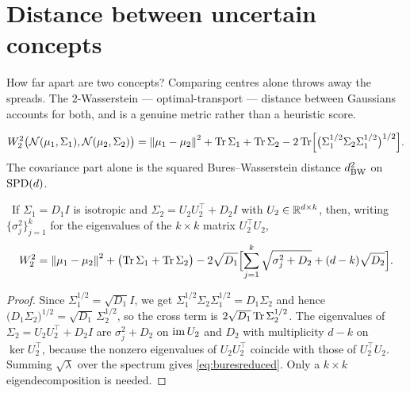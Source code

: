 \section{Distance between uncertain concepts}

\begin{intu}\Intu
How far apart are two concepts? Comparing centres alone throws away the
spreads. The $2$-Wasserstein --- optimal-transport --- distance between
Gaussians accounts for both, and is a genuine metric rather than a
heuristic score.
\end{intu}

\begin{definition}\label{def:bures}
\begin{equation}\label{eq:bures}
  W_2^2\bigl(\mathcal N(\mu_1,\Sigma_1),\mathcal N(\mu_2,\Sigma_2)\bigr)
  =\left\lVert \mu_1-\mu_2 \right\rVert^2+\operatorname{Tr}\Sigma_1+\operatorname{Tr}\Sigma_2
   -2\operatorname{Tr}\Bigl[\bigl(\Sigma_1^{1/2}\Sigma_2\Sigma_1^{1/2}\bigr)^{1/2}\Bigr].
\end{equation}
The covariance part alone is the squared Bures--Wasserstein distance
$d_{\mathrm{BW}}^2$ on $\mathrm{SPD}(d)$.
\end{definition}

\begin{proposition}\label{prop:buresiso}
\Proved\ If $\Sigma_1=D_1I$ is isotropic and
$\Sigma_2=U_2U_2^\top+D_2I$ with $U_2\in\mathbb{R}^{d\times k}$, then, writing
$\{\sigma_j^2\}_{j=1}^k$ for the eigenvalues of the $k\times k$ matrix
$U_2^\top U_2$,
\begin{equation}\label{eq:buresreduced}
  W_2^2=\left\lVert \mu_1-\mu_2 \right\rVert^2+\bigl(\operatorname{Tr}\Sigma_1+\operatorname{Tr}\Sigma_2\bigr)
  -2\sqrt{D_1}\Bigl[\sum_{j=1}^k\sqrt{\sigma_j^2+D_2}+(d-k)\sqrt{D_2}\Bigr].
\end{equation}
\end{proposition}
\begin{proof}
Since $\Sigma_1^{1/2}=\sqrt{D_1}I$, we get
$\Sigma_1^{1/2}\Sigma_2\Sigma_1^{1/2}=D_1\Sigma_2$ and hence
$\bigl(D_1\Sigma_2\bigr)^{1/2}=\sqrt{D_1}\,\Sigma_2^{1/2}$, so the cross
term is $2\sqrt{D_1}\operatorname{Tr}\Sigma_2^{1/2}$. The eigenvalues of
$\Sigma_2=U_2U_2^\top+D_2I$ are $\sigma_j^2+D_2$ on $\operatorname{im} U_2$ and $D_2$
with multiplicity $d-k$ on $\ker U_2^\top$, because the nonzero
eigenvalues of $U_2U_2^\top$ coincide with those of $U_2^\top U_2$.
Summing $\sqrt{\lambda}$ over the spectrum gives
\eqref{eq:buresreduced}. Only a $k\times k$ eigendecomposition is
needed.
\end{proof}

